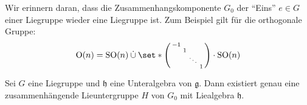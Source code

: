 Wir erinnern daran, dass die Zusammenhangskomponente $G_0$ der \enquote{Eins} $e \in G$ einer Liegruppe wieder eine Liegruppe ist.
Zum Beispiel gilt für die orthogonale Gruppe: 
\[
	\On(n)= \SO(n) \mathbin{\dot{\cup}} \set*{ \begin{psmallmatrix}
		-1 & & &\\
		& 1 &  &\\
		& & \ddots & \\
		& & & 1
	\end{psmallmatrix} \cdot \SO(n)}
\]

\begin{satz}[label=satz:125,{name=[Lieuntergruppe zu Lieunteralgebra]}]
	Sei $G$ eine Liegruppe und $\mathfrak{h}$ eine Unteralgebra von $\mathfrak{g}$.
	Dann existiert genau eine zusammenhängende Lieuntergruppe $H$ von $G_0$ mit Liealgebra $\mathfrak{h}$. 
\end{satz}
